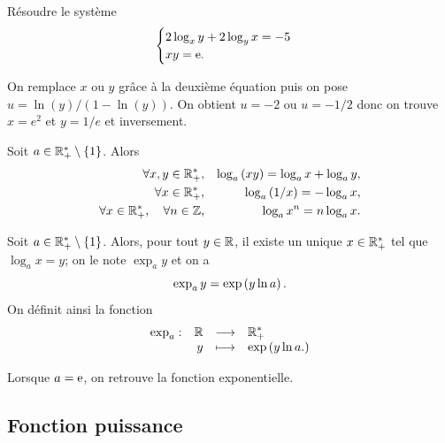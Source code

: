 \documentclass{magnolia}
\begin{document}
\begin{exoUnique}
\exo Résoudre le système
  \[\begin{cases}
    2\log_x y+2\log_y x=-5 &\\
    xy={\rm e}. &
    \end{cases}\]
  \begin{sol}
  On remplace $x$ ou $y$ grâce à la deuxième équation puis on pose $u=\ln(y)/(1-\ln(y))$. On obtient $u=-2$ ou $u=-1/2$ donc on trouve $x=e^2$ et $y=1/e$ et inversement.    
  \end{sol}
\end{exoUnique}

\begin{proposition}[utile=-3]
Soit $a\in\mathbb{R}_+^*\setminus\left\{1\right\}$. Alors
\begin{eqnarray*}
\forall x,y\in\mathbb{R}_+^*, & & \log_a \left(xy\right)=\log_a  x+\log_a  y,\\
\forall x\in\mathbb{R}_+^*, & & \log_a \left(1/x\right)=-\log_a  x,\\
\forall x\in\mathbb{R}_+^* ,\quad \forall n\in\mathbb{Z}, & & \log_a  x^n=n\log_a x.
\end{eqnarray*}
\end{proposition}

\begin{definition}[utile=-3]
Soit $a\in\mathbb{R}_+^*\setminus\left\{1\right\}$. Alors, pour tout $y\in\mathbb{R}$, il existe un unique
$x\in\mathbb{R}_+^*$ tel que $\log_a x=y$; on le note $\exp_a y$ et on a
\[\exp_a y=\exp\left(y\ln a\right).\]
On définit ainsi la fonction
\[\begin{array}[t]{lrcl} \displaystyle{\exp_a} : & \displaystyle{\mathbb{R}} & \longrightarrow & \displaystyle{\mathbb{R}_+^*} \\ & \displaystyle{y} & \longmapsto & \displaystyle{\exp\left(y \ln a .\right)} \end{array}\]
\end{definition}

\begin{remarqueUnique}
\remarque Lorsque $a={\rm e}$, on retrouve la fonction exponentielle.  
\end{remarqueUnique}


\subsection{Fonction puissance}
\end{document}
